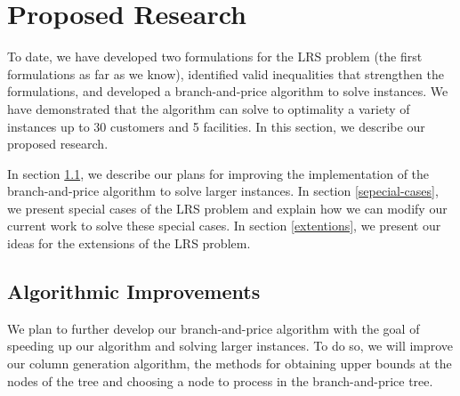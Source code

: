 \chapter{Proposed Research}
\label{proposedRes}

To date, we have developed two formulations for the LRS problem (the first formulations
as far as we know), identified valid inequalities that strengthen the formulations, and
developed a branch-and-price algorithm to solve instances. We have demonstrated that
the algorithm can solve to optimality a variety of instances up to 30 customers 
and 5 facilities. In this section, we describe our proposed research. 

In section \ref{algo-dev}, we describe our plans for improving the implementation
of the branch-and-price algorithm to solve larger instances. In section 
\ref{sepecial-cases}, we present special cases of the LRS problem and explain how
we can modify our current work to solve these special cases. In section 
\ref{extentions}, we  present our ideas for the extensions of the LRS problem.   

\section {Algorithmic Improvements}
\label{algo-dev}
We plan to further develop our branch-and-price algorithm with the goal of speeding 
up our algorithm and solving larger instances. To do so, we will  
improve our column generation algorithm, the methods for obtaining upper bounds 
at the nodes of the tree and choosing a node to process in the branch-and-price tree.


